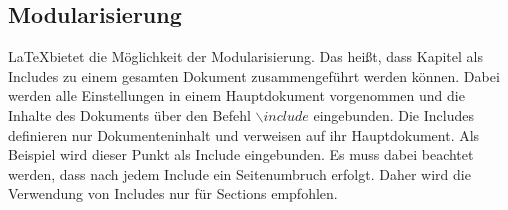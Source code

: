 

\subsection{Modularisierung}
\LaTeX bietet die Möglichkeit der Modularisierung. Das heißt, dass Kapitel als Includes zu einem gesamten Dokument zusammengeführt werden können. Dabei werden alle Einstellungen in einem Hauptdokument vorgenommen und die Inhalte des Dokuments über den Befehl $\backslash include$ eingebunden. Die Includes definieren nur Dokumenteninhalt und verweisen auf ihr Hauptdokument. Als Beispiel wird dieser Punkt als Include eingebunden. Es muss dabei beachtet werden, dass nach jedem Include ein Seitenumbruch erfolgt. Daher wird die Verwendung von Includes nur für Sections empfohlen.
